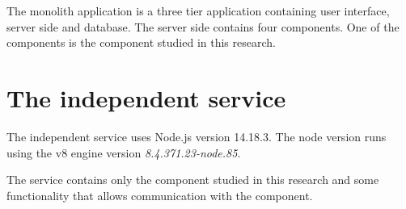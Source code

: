 The monolith application is a three tier application containing user interface, server side and database.
The server side contains four components.
One of the components is the component studied in this research.

\section{The independent service}
The independent service uses Node.js version 14.18.3. The node version runs using the v8 engine version \textit{8.4.371.23-node.85}.

The service contains only the component studied in this research and some functionality that allows communication with the component.
